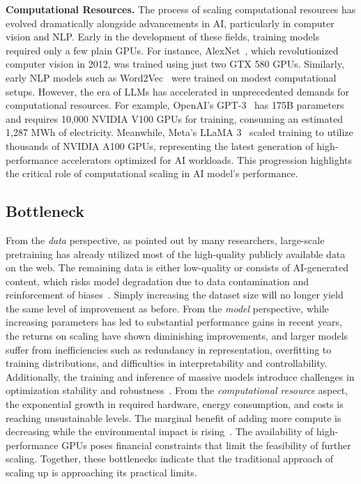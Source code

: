 \textbf{Computational Resources.}
The process of scaling computational resources has evolved dramatically alongside advancements in AI, particularly in computer vision and NLP. Early in the development of these fields, training models required only a few plain GPUs. For instance, AlexNet~\cite{krizhevsky2012imagenet}, which revolutionized computer vision in 2012, was trained using just two GTX 580 GPUs. Similarly, early NLP models such as Word2Vec~\cite{church2017word2vec} were trained on modest computational setups. However, the era of LLMs has accelerated in unprecedented demands for computational resources. For example, OpenAI’s GPT-3~\cite{brown2020language} has 175B parameters and requires 10,000 NVIDIA V100 GPUs for training, consuming an estimated 1,287 MWh of electricity. Meanwhile, Meta’s LLaMA 3~\cite{touvron2023llama} scaled training to utilize thousands of NVIDIA A100 GPUs, representing the latest generation of high-performance accelerators optimized for AI workloads. This progression highlights the critical role of computational scaling in AI model's performance.


\subsection{Bottleneck}
From the \textit{data} perspective, as pointed out by many researchers, large-scale pretraining has already utilized most of the high-quality publicly available data on the web. The remaining data is either low-quality or consists of AI-generated content, which risks model degradation due to data contamination and reinforcement of biases~\cite{shumailov2024ai}. Simply increasing the dataset size will no longer yield the same level of improvement as before. From the \textit{model} perspective, while increasing parameters has led to substantial performance gains in recent years, the returns on scaling have shown diminishing improvements, and larger models suffer from inefficiencies such as redundancy in representation, overfitting to training distributions, and difficulties in interpretability and controllability. Additionally, the training and inference of massive models introduce challenges in optimization stability and robustness~\cite{dai2024enhancing}. From the \textit{computational resource} aspect, the exponential growth in required hardware, energy consumption, and costs is reaching unsustainable levels. The marginal benefit of adding more compute is decreasing while the environmental impact is rising~\cite{wu2024beyond}. The availability of high-performance GPUs poses financial constraints that limit the feasibility of further scaling. 
Together, these bottlenecks indicate that the traditional approach of scaling up is approaching its practical limits.


